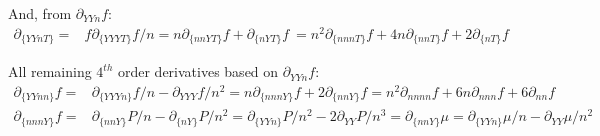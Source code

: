 \documentclass[11pt,letter]{article}
\begin{document}
And, from $\partial_{YYn}f$:
\begin{equation}
 \begin{split}
  \partial_{\{YYnT\}}=&f\partial_{\{YYYT\}}f/n=n\partial_{\{nnYT\}}f+\partial_{\{nYT\}}f\ =n^2\partial_{\{nnnT\}}f+4n\partial_{\{nnT\}}f+2\partial_{\{nT\}}f
 \end{split}
\end{equation}


All remaining $4^{th}$ order derivatives based on $\partial_{YYn}f$:
\begin{equation}
 \begin{split}
  \partial_{\{YYnn\}}f=&\partial_{\{YYYn\}}f/n-\partial_{YYY}f/n^2=n\partial_{\{nnnY\}}f+2\partial_{\{nnY\}}f=n^2\partial_{nnnn}f+6n\partial_{nnn}f+6\partial_{nn}f\\
  \partial_{\{nnnY\}}f=&\partial_{\{nnY\}}P/n-\partial_{\{nY\}}P/n^2=\partial_{\{YYn\}}P/n^2-2\partial_{YY}P/n^3=\partial_{\{nnY\}}\mu=\partial_{\{YYn\}}\mu/n-\partial_{YY}\mu/n^2
 \end{split}
\end{equation}
\end{document}
